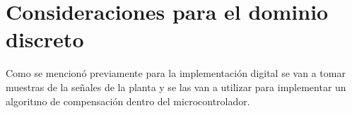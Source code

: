 %
%
%
%
%


\section{Consideraciones para el dominio discreto}\label{consideraciones_sistemas_discretos}

Como se mencionó previamente para la implementación digital se van a tomar muestras de la señales de la planta y se las van a utilizar para implementar un algoritmo de compensación dentro del microcontrolador. 

